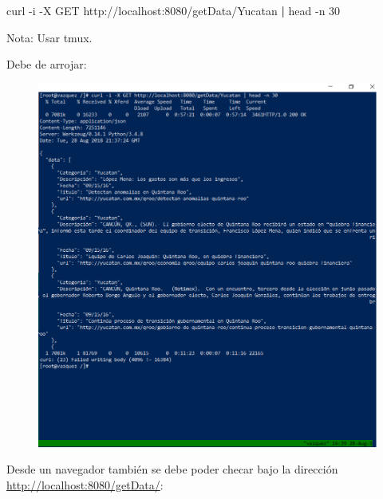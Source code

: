 \documentclass[]{article}
\newenvironment{Shaded}{\begin{snugshade}}{\end{snugshade}}
\newcommand{\KeywordTok}[1]{\textcolor[rgb]{0.13,0.29,0.53}{\textbf{#1}}}
\newcommand{\FunctionTok}[1]{\textcolor[rgb]{0.00,0.00,0.00}{#1}}
\newcommand{\ExtensionTok}[1]{#1}
\newcommand{\NormalTok}[1]{#1}
\begin{document}
\begin{Shaded}
\begin{Highlighting}[]
 \ExtensionTok{curl}\NormalTok{ -i -X GET http://localhost:8080/getData/Yucatan }\KeywordTok{|} \FunctionTok{head}\NormalTok{ -n 30}
\end{Highlighting}
\end{Shaded}

Nota: Usar tmux.

Debe de arrojar:

\begin{figure}[htbp]
\centering
\includegraphics{getcommand.png}
\end{figure}

\newpage

Desde un navegador también se debe poder checar bajo la dirección
\url{http://localhost:8080/getData/}:
\end{document}
